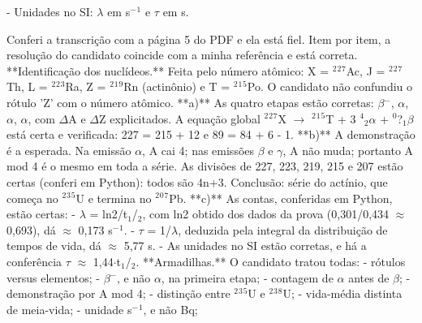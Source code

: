 \documentclass{article}%
\begin{document}
{-} Unidades no SI: $\lambda$ em s$^{-}$$^{1}$ e $\tau$ em s.\par %
Conferi a transcrição com a página 5 do PDF e ela está fiel. Item por item, a resolução do candidato coincide com a minha referência e está correta.\newline%
\newline%
**Identificação dos nuclídeos.** Feita pelo número atômico: X = $^2$$^2$$^{7}$Ac, J = $^2$$^2$$^{7}$Th, L = $^2$$^2$$^3$Ra, Z = $^2$$^{1}$$^{9}$Rn (actinônio) e T = $^2$$^{1}$$^{5}$Po. O candidato não confundiu o rótulo 'Z' com o número atômico.\newline%
\newline%
**a)** As quatro etapas estão corretas: $\beta$$^{-}$, $\alpha$, $\alpha$, $\alpha$, com $\Delta$A e $\Delta$Z explicitados. A equação global $^2$$^2$$^{7}$X $\to$ $^2$$^{1}$$^{5}$T + 3 $^{4}$$_{2}$$\alpha$ + $^{0}$?$_{1}$$\beta$ está certa e verificada: 227 = 215 + 12 e 89 = 84 + 6 - 1.\newline%
\newline%
**b)** A demonstração é a esperada. Na emissão $\alpha$, A cai 4; nas emissões $\beta$ e $\gamma$, A não muda; portanto A mod 4 é o mesmo em toda a série. As divisões de 227, 223, 219, 215 e 207 estão certas (conferi em Python): todos são 4n+3. Conclusão: série do actínio, que começa no $^2$$^3$$^{5}$U e termina no $^2$$^{0}$$^{7}$Pb.\newline%
\newline%
**c)** As contas, conferidas em Python, estão certas:\newline%
{-} $\lambda$ = ln2/t$_{1}$/$_{2}$, com ln2 obtido dos dados da prova (0,301/0,434 $\approx$ 0,693), dá $\approx$ 0,173 s$^{-}$$^{1}$.\newline%
{-} $\tau$ = 1/$\lambda$, deduzida pela integral da distribuição de tempos de vida, dá $\approx$ 5,77 s.\newline%
{-} As unidades no SI estão corretas, e há a conferência $\tau$ $\approx$ 1,44$\cdot$t$_{1}$/$_{2}$.\newline%
\newline%
**Armadilhas.** O candidato tratou todas:\newline%
{-} rótulos versus elementos;\newline%
{-} $\beta$$^{-}$, e não $\alpha$, na primeira etapa;\newline%
{-} contagem de $\alpha$ antes de $\beta$;\newline%
{-} demonstração por A mod 4;\newline%
{-} distinção entre $^2$$^3$$^{5}$U e $^2$$^3$$^{8}$U;\newline%
{-} vida{-}média distinta de meia{-}vida;\newline%
{-} unidade s$^{-}$$^{1}$, e não Bq;\newline%
\end{document}
